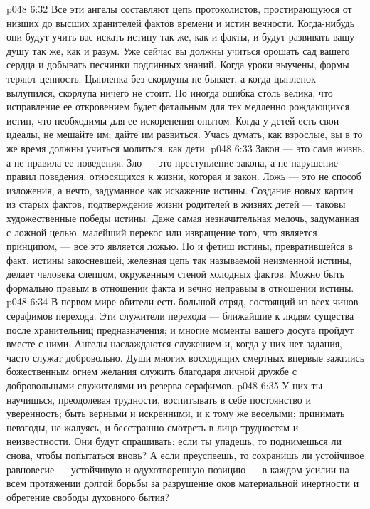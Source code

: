 \vs p048 6:32 Все эти ангелы составляют цепь протоколистов, простирающуюся от низших до высших хранителей фактов времени и истин вечности. Когда\hyp{}нибудь они будут учить вас искать истину так же, как и факты, и будут развивать вашу душу так же, как и разум. Уже сейчас вы должны учиться орошать сад вашего сердца и добывать песчинки подлинных знаний. Когда уроки выучены, формы теряют ценность. Цыпленка без скорлупы не бывает, а когда цыпленок вылупился, скорлупа ничего не стоит. Но иногда ошибка столь велика, что исправление ее откровением будет фатальным для тех медленно рождающихся истин, что необходимы для ее искоренения опытом. Когда у детей есть свои идеалы, не мешайте им; дайте им развиться. Учась думать, как взрослые, вы в то же время должны учиться молиться, как дети.
\vs p048 6:33 Закон --- это сама жизнь, а не правила ее поведения. Зло --- это преступление закона, а не нарушение правил поведения, относящихся к жизни, которая и  закон. Ложь --- это не способ изложения, а нечто, задуманное как искажение истины. Создание новых картин из старых фактов, подтверждение жизни родителей в жизнях детей --- таковы художественные победы истины. Даже самая незначительная мелочь, задуманная с ложной целью, малейший перекос или извращение того, что является принципом, --- все это является ложью. Но и фетиш истины, превратившейся в факт, истины закосневшей, железная цепь так называемой неизменной истины, делает человека слепцом, окруженным стеной холодных фактов. Можно быть формально правым в отношении факта и вечно неправым в отношении истины.
\vs p048 6:34 \bibnobreakspace {} В первом мире\hyp{}обители есть большой отряд, состоящий из всех чинов серафимов перехода. Эти служители перехода --- ближайшие к людям существа после хранительниц предназначения; и многие моменты вашего досуга пройдут вместе с ними. Ангелы наслаждаются служением и, когда у них нет задания, часто служат добровольно. Души многих восходящих смертных впервые зажглись божественным огнем желания служить благодаря личной дружбе с добровольными служителями из резерва серафимов.
\vs p048 6:35 У них ты научишься, преодолевая трудности, воспитывать в себе постоянство и уверенность; быть верными и искренними, и к тому же веселыми; принимать невзгоды, не жалуясь, и бесстрашно смотреть в лицо трудностям и неизвестности. Они будут спрашивать: если ты упадешь, то поднимешься ли снова, чтобы попытаться вновь? А если преуспеешь, то сохранишь ли устойчивое равновесие --- устойчивую и одухотворенную позицию --- в каждом усилии на всем протяжении долгой борьбы за разрушение оков материальной инертности и обретение свободы духовного бытия?
